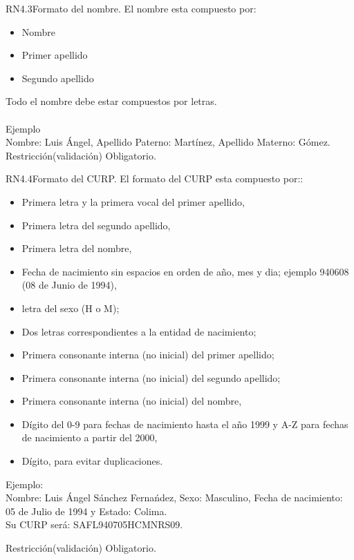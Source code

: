 
\begin{BussinesRule}{RN4.3}{Formato del nombre.}
	\BRitem[Descripción:] El nombre esta compuesto por:
		\begin{itemize} 
			\item Nombre
			\item Primer apellido
			\item Segundo apellido 
		\end{itemize}
		Todo el nombre debe estar compuestos por letras.\\\\
Ejemplo \\
	Nombre: Luis Ángel, Apellido Paterno: Martínez, Apellido Materno: Gómez.
	\BRitem[Tipo:] Restricción(validación)
	\BRitem[Nivel:] Obligatorio.
\end{BussinesRule}


\begin{BussinesRule}{RN4.4}{Formato del CURP.}
	\BRitem[Descripción:] El formato del CURP esta compuesto por::
		\begin{itemize}
			\item Primera letra y la primera vocal del primer apellido,
			\item Primera letra del segundo apellido,
			\item Primera letra del nombre,
			\item Fecha de nacimiento sin espacios en orden de año, mes y dia; ejemplo 940608 (08 de Junio de 1994),
			\item letra del sexo (H o M);
			\item Dos letras correspondientes a la entidad de nacimiento;
			\item Primera consonante interna (no inicial) del primer apellido;
			\item Primera consonante interna (no inicial) del segundo apellido;
			\item Primera consonante interna (no inicial) del nombre,
			\item Dígito del 0-9 para fechas de nacimiento hasta el año 1999 y A-Z para fechas de nacimiento a partir del 2000,
			\item Dígito, para evitar duplicaciones.			
		\end{itemize}

Ejemplo:\\
	Nombre: Luis Ángel Sánchez Fernańdez, Sexo: Masculino, Fecha de nacimiento: 05 de Julio de 1994 y Estado: Colima.\\
	Su CURP será: SAFL940705HCMNRS09.

	\BRitem[Tipo:] Restricción(validación)
	\BRitem[Nivel:] Obligatorio.
\end{BussinesRule}

